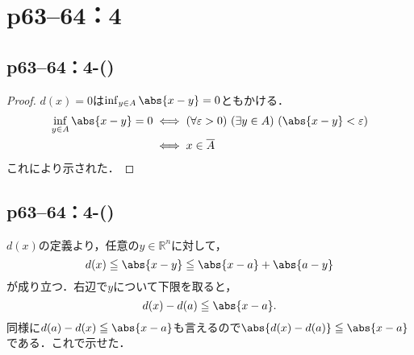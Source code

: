 \documentclass[a4paper,10pt,fleqn]{ltjsarticle}
\begin{document}
\section*{p63--64：4}


\subsection*{p63--64：4-()}

\begin{tleftbar}
    \begin{proof}
        $d(x)=0$は$\inf_{y \in A} \abs{x-y} =0$ともかける．
        \begin{align*}
            \inf_{y \in A} \abs{x-y} =0 & \iff (\forall \varepsilon>0) \ (\exists y \in A)\ ( \abs{x-y}<\varepsilon ) \\
                                        & \iff x \in \overline{A}
        \end{align*}
        これにより示された．
    \end{proof}
\end{tleftbar}


\subsection*{p63--64：4-()}


\begin{leftbar}
    $d(x)$の定義より，任意の$y \in \mathbb{R} ^n$に対して，
    \[
        d(x) \leq \abs{x-y} \leq \abs{x-a} + \abs{a-y}
    \]
    が成り立つ．右辺で$y$について下限を取ると，
    \[
        d(x) - d(a) \leq \abs{x-a}.
    \]
    同様に$d(a) - d(x) \leq \abs{x-a}$も言えるので$\abs{d(x) - d(a)} \leq \abs{x-a}$である．これで示せた．
\end{leftbar}

\newpage
\end{document}
